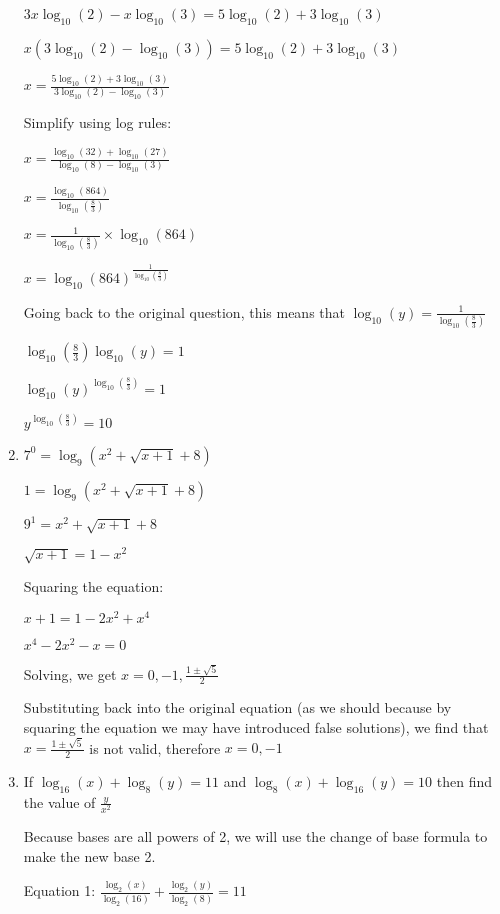 \documentclass[../main.tex]{subfiles}
\begin{document}
\begin{enumerate}[itemsep=0.4cm]
    \(3x\log_{10}(2)-x\log_{10}(3)=5\log_{10}(2)+3\log_{10}(3)\)

    \(x(3\log_{10}(2)-\log_{10}(3))=5\log_{10}(2)+3\log_{10}(3)\)

    \(x=\frac{5\log_{10}(2)+3\log_{10}(3)}{3\log_{10}(2)-\log_{10}(3)}\)

    Simplify using log rules:

    \(x=\frac{\log_{10}(32)+\log_{10}(27)}{\log_{10}(8)-\log_{10}(3)}\)

    \(x=\frac{\log_{10}(864)}{\log_{10}(\frac{8}{3})}\)

    \(x=\frac{1}{\log_{10}(\frac{8}{3})}\times \log_{10}(864)\)

    \(x=\log_{10}(864)^{\frac{1}{\log_{10}(\frac{8}{3})}}\)

    Going back to the original question, this means that $\log_{10}(y)=\frac{1}{\log_{10}(\frac{8}{3})}$

    \(\log_{10}(\frac{8}{3})\log_{10}(y)=1\)

    \(\log_{10}(y)^{\log_{10}(\frac{8}{3})} = 1\)

    \(y^{\log_{10}(\frac{8}{3})}=10\)



    \item 
    \(7^0=\log_9(x^2+\sqrt{x+1}+8)\)

    \(1=\log_9(x^2+\sqrt{x+1}+8)\)

    \(9^1=x^2+\sqrt{x+1}+8 \)

    \(\sqrt{x+1}=1-x^2\)

    Squaring the equation:

    \(x+1=1-2x^2+x^4\)

    \(x^4-2x^2-x=0\)

    Solving, we get $x=0, -1, \frac{1\pm\sqrt{5}}{2}$

    Substituting back into the original equation (as we should because by squaring the equation we may have introduced false solutions), we find that $x=\frac{1\pm \sqrt{5}}{2}$ is not valid, therefore $x=0,-1$

    \item 
    If $\log_{16}(x)+\log_8(y)=11$ and $\log_8(x)+\log_{16}(y)=10$ then find the value of $\frac{y}{x^2}$

    Because bases are all powers of 2, we will use the change of base formula to make the new base 2.

    Equation 1: $\frac{\log_2(x)}{\log_2(16)}+\frac{\log_2(y)}{\log_2(8)}=11 $


\end{enumerate}
\end{document}

